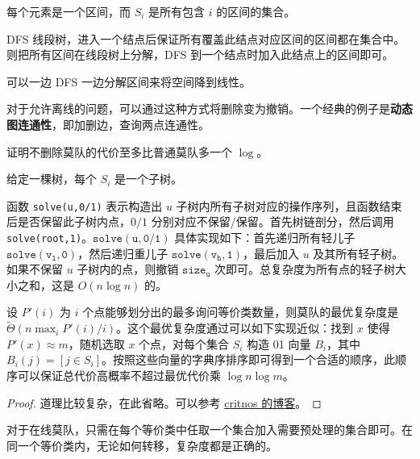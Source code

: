 \begin{example}
    每个元素是一个区间，而 $S_i$ 是所有包含 $i$ 的区间的集合。
\end{example}
\begin{solution}
    DFS 线段树，进入一个结点后保证所有覆盖此结点对应区间的区间都在集合中。则把所有区间在线段树上分解，DFS 到一个结点时加入此结点上的区间即可。

    可以一边 DFS 一边分解区间来将空间降到线性。
\end{solution}
\begin{exercise}
    对于允许离线的问题，可以通过这种方式将删除变为撤销。一个经典的例子是\textbf{动态图连通性}，即加删边，查询两点连通性。
\end{exercise}
\begin{exercise}
    证明不删除莫队的代价至多比普通莫队多一个 $\log$。
\end{exercise}


\begin{example}
    给定一棵树，每个 $S_i$ 是一个子树。
\end{example}
\begin{exercise}
    函数 \texttt{solve(u,0/1)} 表示构造出 $u$ 子树内所有子树对应的操作序列，且函数结束后是否保留此子树内点，$0/1$ 分别对应不保留/保留。首先树链剖分，然后调用 \texttt{solve(root,1)}。$\mathtt{solve(u,0/1)}$ 具体实现如下：首先递归所有轻儿子 $\mathtt{solve(v_l,0)}$，然后递归重儿子 $\mathtt{solve(v_h,1)}$，最后加入 $u$ 及其所有轻子树。如果不保留 $u$ 子树内的点，则撤销 $\mathtt{size_u}$ 次即可。总复杂度为所有点的轻子树大小之和，这是 $O(n\log n)$ 的。
\end{exercise}

\begin{theorem}[莫队之理]
    设 $P'(i)$ 为 $i$ 个点能够划分出的最多询问等价类数量，则莫队的最优复杂度是 $\tilde \Theta(n\max_{i}P'(i)/i)$。这个最优复杂度通过可以如下实现近似：找到 $x$ 使得 $P'(x)\approx m$，随机选取 $x$ 个点，对每个集合 $S_i$ 构造 01 向量 $B_i$，其中 $B_{i}(j)=[j\in S_i]$。按照这些向量的字典序排序即可得到一个合适的顺序，此顺序可以保证总代价高概率不超过最优代价乘 $\log n\log m$。
\end{theorem}
\begin{proof}
    道理比较复杂，在此省略。可以参考 \href{https://www.luogu.com.cn/article/o6pe9wm3}{critnos 的博客}。
    
\end{proof}
\begin{theorem}
    对于在线莫队，只需在每个等价类中任取一个集合加入需要预处理的集合即可。在同一个等价类内，无论如何转移，复杂度都是正确的。
\end{theorem}

